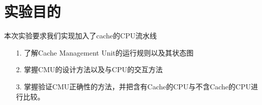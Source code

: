 \section{实验目的}
本次实验要求我们实现加入了cache的CPU流水线
\begin{itemize}
    \item [1.] 了解Cache Management Unit的运行规则以及其状态图
    \item [2.] 掌握CMU的设计方法以及与CPU的交互方法
    \item [3.] 掌握验证CMU正确性的方法，并把含有Cache的CPU与不含Cache的CPU进行比较。
\end{itemize}    